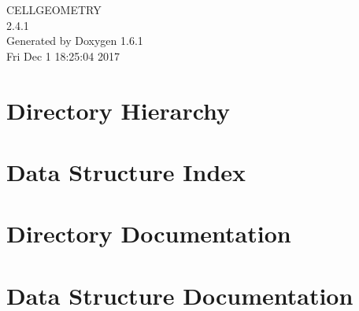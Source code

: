 \documentclass[a4paper]{book}
\begin{document}
\begin{titlepage}
\vspace*{7cm}
\begin{center}
{\Large CELLGEOMETRY \\[1ex]\large 2.4.1 }\\
\vspace*{1cm}
{\large Generated by Doxygen 1.6.1}\\
\vspace*{0.5cm}
{\small Fri Dec 1 18:25:04 2017}\\
\end{center}
\end{titlepage}
\clearemptydoublepage
{}
\tableofcontents
\clearemptydoublepage
{}
\chapter{Directory Hierarchy}

\chapter{Data Structure Index}

\chapter{Directory Documentation}




\chapter{Data Structure Documentation}




\printindex
\end{document}
